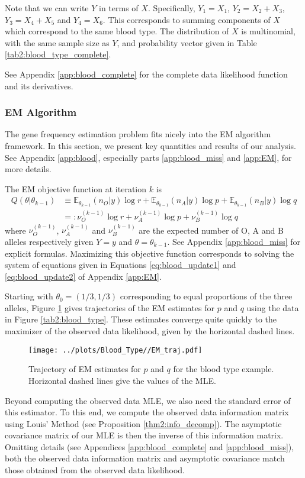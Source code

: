 \documentclass[11pt, oneside]{article}   	%
\newcommand{\bE}{\mathbb{E}}
\begin{document}
Note that we can write $Y$ in terms of $X$. Specifically, $Y_1 = X_1$, $Y_2 = X_2 + X_3$, $Y_3 = X_4 + X_5$ and $Y_4 = X_6$. This corresponds to summing components of $X$ which correspond to the same blood type. The distribution of $X$ is multinomial, with the same sample size as $Y$, and probability vector given in Table \ref{tab2:blood_type_complete}.

See Appendix \ref{app:blood_complete} for the complete data likelihood function and its derivatives.

\subsubsection{EM Algorithm}

The gene frequency estimation problem fits nicely into the EM algorithm framework. In this section, we present key quantities and results of our analysis. See Appendix \ref{app:blood}, especially parts \ref{app:blood_miss} and \ref{app:EM}, for more details.

The EM objective function at iteration $k$ is
%
\begin{align}
    Q(\theta|\theta_{k-1}) &\equiv  \bE_{\theta_{k-1}}(n_O | y) \log r + \bE_{\theta_{k-1}}(n_A | y) \log p + \bE_{\theta_{k-1}}(n_B | y) \log q\\
    &=: \nu^{(k-1)}_O \log r + \nu^{(k-1)}_A \log p + \nu^{(k-1)}_B \log q
\end{align}
%
where $\nu^{(k-1)}_O$, $\nu^{(k-1)}_A$ and $\nu^{(k-1)}_B$ are the expected number of O, A and B alleles respectively given $Y=y$ and $\theta = \theta_{k-1}$. See Appendix \ref{app:blood_miss} for explicit formulas. Maximizing this objective function corresponds to solving the system of equations given in Equations \ref{eq:blood_update1} and \ref{eq:blood_update2} of Appendix \ref{app:EM}.

Starting with $\theta_0 = (1/3, 1/3)$ corresponding to equal proportions of the three alleles, Figure \ref{fig:blood_EM_traj} gives trajectories of the EM estimates for $p$ and $q$ using the data in Figure \ref{tab2:blood_type}. These estimates converge quite quickly to the maximizer of the observed data likelihood, given by the horizontal dashed lines.
%
\begin{figure}
    \centering
    \caption{Trajectory of EM estimates for $p$ and $q$ for the blood type example. Horizontal dashed lines give the values of the MLE.}
    \label{fig:blood_EM_traj}
    \texttt{[image: ../plots/Blood\_Type//EM\_traj.pdf]}
\end{figure}
%
Beyond computing the observed data MLE, we also need the standard error of this estimator. To this end, we compute the observed data information matrix using Louis' Method (see Proposition \ref{thm2:info_decomp}). The asymptotic covariance matrix of our MLE is then the inverse of this information matrix. Omitting details (see Appendices \ref{app:blood_complete} and \ref{app:blood_miss}), both the observed data information matrix and asymptotic covariance match those obtained from the observed data likelihood. 
%
\end{document}
